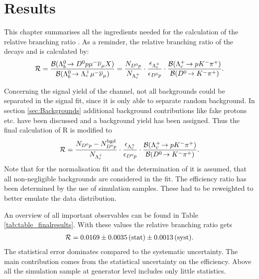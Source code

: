 \chapter{Results}
\label{sec:Results}
This chapter summarises all the ingredients needed for the calculation of the relative branching ratio \R.
As a reminder, the relative branching ratio of the decays \LbToDpmunuX and \LbToLcmunu is calculated by:
\begin{align}
	\mathcal{R} =
	\frac{{\cal B}({{\Lambda}^0_{b}}\!\rightarrow {\ensuremath{{D}^0}}{\ensuremath{p}} {\ensuremath{\mu^-}} {\ensuremath{{\overline{\nu}}_\mu}} X)}{{\cal B}({{\Lambda}^0_{b}}\!\rightarrow {\ensuremath{{\Lambda}^+_{c}}} {\ensuremath{\mu^-}}{\ensuremath{{\overline{\nu}}_\mu}})}
	 = 
	 \frac{N_{{{D}^0}{p}}}{N_{{{\Lambda}^+_{c}}}}  
	 \cdot \frac{\epsilon_{{{\Lambda}^+_{c}}}}{\epsilon_{{{D}^0}{p}}}
	 \cdot \frac{{\cal B}({{\Lambda}^+_{c}}\!\rightarrow p {{K}^-} {{\pi}^+})}{{\cal B}({{D}^0}\!\rightarrow {\ensuremath{{K}^-}}{\ensuremath{{\pi}^+}})}.
\end{align}

Concerning the signal yield \NDp of the \LbToDpmunuX channel, not all backgrounds could be separated in the signal fit, since it is only able to separate random background.
In section \ref{sec:Backgrounds} additional background contributions like fake protons etc. have been discussed and a background yield \NBgdDp has been assigned.
Thus the final calculation of R is modified to
\begin{align}
	\mathcal{R} =
	 \frac{N_{{{D}^0}{p}}-N^{\rm bgd}_{{{D}^0}{p}}}{N_{{{\Lambda}^+_{c}}}}  
	 \cdot \frac{\epsilon_{{{\Lambda}^+_{c}}}}{\epsilon_{{{D}^0}{p}}}
	 \cdot \frac{{\cal B}({{\Lambda}^+_{c}}\!\rightarrow p {{K}^-} {{\pi}^+})}{{\cal B}({{D}^0}\!\rightarrow {\ensuremath{{K}^-}}{\ensuremath{{\pi}^+}})}. \label{eq:R_mod}
\end{align}
Note that for the normalisation fit and the determination of \NLc it is assumed, that all non-negligible backgrounds are considered in the fit.
The efficiency ratio \effRatio has been determined by the use of simulation samples.
These had to be reweighted to better emulate the data distribution.


An overview of all important observables can be found in Table \ref{tab:table_finalresults}.
With these values the relative branching ratio \R gets
\begin{align*}
    \mathcal{R} = 0.0169 \pm 0.0035\mathrm{\,(stat)} \pm 0.0013\mathrm{\,(syst)}.
\end{align*}
The statistical error dominates compared to the systematic uncertainty.
The main contribution comes from the statistical uncertainty on the efficiency.
Above all the simulation sample at generator level includes only little statistics.
